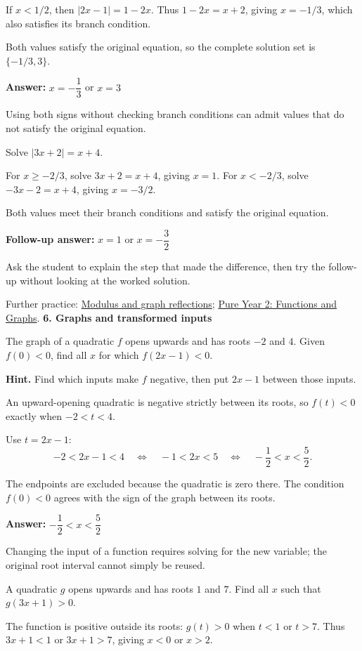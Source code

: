 \documentclass[11pt,a4paper]{article}
\newcommand{\smallheading}[1]{\par\vspace{9pt}{\large\bfseries #1}\par\vspace{1pt}}
\begin{document}
If \(x<1/2\), then \(|2x-1|=1-2x\). Thus \(1-2x=x+2\), giving \(x=-1/3\), which also satisfies its branch condition.

Both values satisfy the original equation, so the complete solution set is \(\{-1/3,3\}\).

\textbf{Answer:} \(x=-\dfrac13\) or \(x=3\)\par
\smallheading{What to notice}
Using both signs without checking branch conditions can admit values that do not satisfy the original equation.\par
\smallheading{Matched follow-up}
Solve \(|3x+2|=x+4\).\par
For \(x\geq-2/3\), solve \(3x+2=x+4\), giving \(x=1\). For \(x<-2/3\), solve \(-3x-2=x+4\), giving \(x=-3/2\).

Both values meet their branch conditions and satisfy the original equation.

\textbf{Follow-up answer:} \(x=1\) or \(x=-\dfrac32\)\par
\vfill\smallheading{Teaching note}
Ask the student to explain the step that made the difference, then try the follow-up without looking at the worked solution.\par
{\small Further practice: \href{https://maths.arijasad.com/modulus-and-graphs.html}{Modulus and graph reflections}; \href{https://maths.arijasad.com/edexcel-pure-year-2.html#chapter-2}{Pure Year 2: Functions and Graphs}.}
\newpage
{\LARGE\bfseries 6. Graphs and transformed inputs}\par
\smallheading{Diagnostic question}
The graph of a quadratic \(f\) opens upwards and has roots \(-2\) and \(4\). Given \(f(0)<0\), find all \(x\) for which \(f(2x-1)<0\).\par
\textbf{Hint.} Find which inputs make \(f\) negative, then put \(2x-1\) between those inputs.\par
\smallheading{Worked solution}
An upward-opening quadratic is negative strictly between its roots, so \(f(t)<0\) exactly when \(-2<t<4\).

Use \(t=2x-1\): \[-2<2x-1<4\quad\Longleftrightarrow\quad -1<2x<5\quad\Longleftrightarrow\quad-\frac12<x<\frac52.\]

The endpoints are excluded because the quadratic is zero there. The condition \(f(0)<0\) agrees with the sign of the graph between its roots.

\textbf{Answer:} \(-\dfrac12<x<\dfrac52\)\par
\smallheading{What to notice}
Changing the input of a function requires solving for the new variable; the original root interval cannot simply be reused.\par
\smallheading{Matched follow-up}
A quadratic \(g\) opens upwards and has roots \(1\) and \(7\). Find all \(x\) such that \(g(3x+1)>0\).\par
The function is positive outside its roots: \(g(t)>0\) when \(t<1\) or \(t>7\). Thus \(3x+1<1\) or \(3x+1>7\), giving \(x<0\) or \(x>2\).
\end{document}
